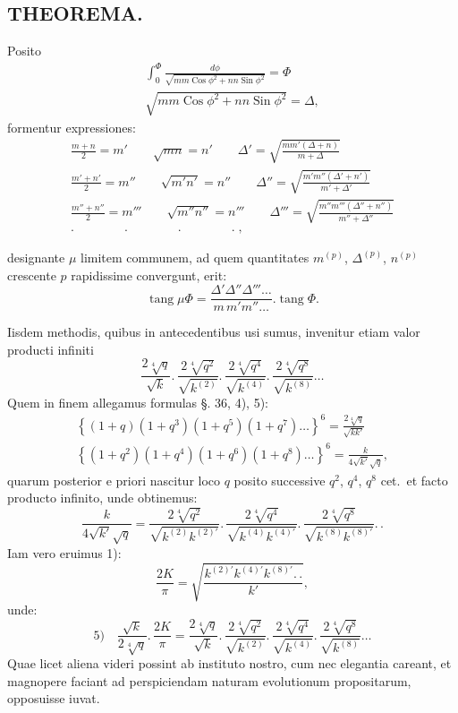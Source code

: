 \documentclass{article}
\begin{document}
\subsection*{THEOREMA.}

Posito
\[
\begin{gathered}
\int_{0}^{\Phi}\frac{d\phi}{\sqrt{mm\operatorname{Cos}\phi^{2}+nn\operatorname{Sin}\phi^{2}}}=\Phi\\[1.5ex]
\sqrt{mm\operatorname{Cos}\phi^{2}+nn\operatorname{Sin}\phi^{2}}=\Delta,
\end{gathered}
\]
formentur expressiones:
\[
\begin{gathered}
\frac{m+n}{2}=m'\qquad\sqrt{mn}=n'\qquad\Delta'=\sqrt{\frac{mm'(\Delta+n)}{m+\Delta}}\\[1.5ex]
\frac{m'+n'}{2}=m''\qquad\sqrt{m'n'}=n''\qquad\Delta''=\sqrt{\frac{m'm''(\Delta'+n')}{m'+\Delta'}}\\[1.5ex]
\frac{m''+n''}{2}=m'''\qquad\sqrt{m''n''}=n'''\qquad\Delta'''=\sqrt{\frac{m''m'''(\Delta''+n'')}{m''+\Delta''}}\\[1.5ex]
.\qquad\qquad.\qquad\qquad.\qquad\qquad.\;,
\end{gathered}
\]

designante $\mu$ limitem communem, ad quem quantitates $m^{(p)}$, $\Delta^{(p)}$, $n^{(p)}$ crescente $p$ rapidissime convergunt, erit:
\[
\operatorname{tang}\mu\Phi=\frac{\Delta'\Delta''\Delta'''\ldots}{m\,m'm''\ldots}.\operatorname{tang}\Phi.
\]

Iisdem methodis, quibus in antecedentibus usi sumus, invenitur etiam valor producti infiniti
\[
\frac{2\sqrt[4]{q}}{\sqrt{k}}.\,\frac{2\sqrt[4]{q^{2}}}{\sqrt{k^{(2)}}}.\,\frac{2\sqrt[4]{q^{4}}}{\sqrt{k^{(4)}}}.\,\frac{2\sqrt[4]{q^{8}}}{\sqrt{k^{(8)}}}\ldots
\]
Quem in finem allegamus formulas §. 36, 4), 5):
\[
\begin{gathered}
\left\{(1+q)(1+q^{3})(1+q^{5})(1+q^{7})\ldots\right\}^{6}=\frac{2\sqrt[4]{q}}{\sqrt{kk'}}\\[1.5ex]
\left\{(1+q^{2})(1+q^{4})(1+q^{6})(1+q^{8})\ldots\right\}^{6}=\frac{k}{4\sqrt{k'}\sqrt{q}},
\end{gathered}
\]
quarum posterior e priori nascitur loco $q$ posito successive $q^{2}$, $q^{4}$, $q^{8}$ cet.\ et facto producto infinito, unde obtinemus:
\[
\frac{k}{4\sqrt{k'}\sqrt{q}}=\frac{2\sqrt[4]{q^{2}}}{\sqrt{k^{(2)}k^{(2)\prime}}}.\,\frac{2\sqrt[4]{q^{4}}}{\sqrt{k^{(4)}k^{(4)\prime}}}.\,\frac{2\sqrt[4]{q^{8}}}{\sqrt{k^{(8)}k^{(8)\prime}}}.\,.
\]
Iam vero eruimus 1):
\[
\frac{2K}{\pi}=\sqrt{\frac{k^{(2)\prime}k^{(4)\prime}k^{(8)\prime}.\,.}{k'}},
\]
unde:
\[
\text{5)}\quad\frac{\sqrt{k}}{2\sqrt[4]{q}}.\,\frac{2K}{\pi}=\frac{2\sqrt[4]{q}}{\sqrt{k}}.\,\frac{2\sqrt[4]{q^{2}}}{\sqrt{k^{(2)}}}.\,\frac{2\sqrt[4]{q^{4}}}{\sqrt{k^{(4)}}}.\,\frac{2\sqrt[4]{q^{8}}}{\sqrt{k^{(8)}}}\ldots
\]
Quae licet aliena videri possint ab instituto nostro, cum nec elegantia careant, et magnopere faciant ad perspiciendam naturam evolutionum propositarum, opposuisse  iuvat.
\end{document}
